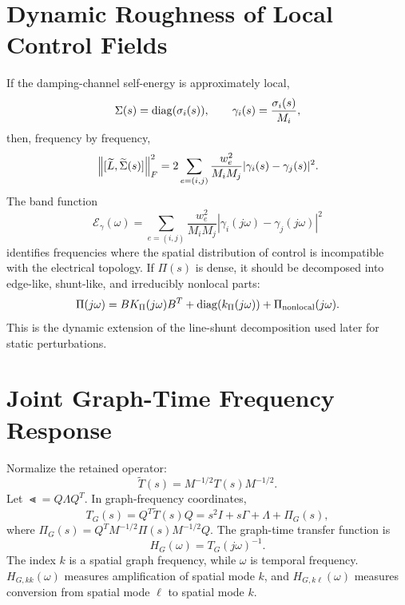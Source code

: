 \section{Dynamic Roughness of Local Control Fields}

If the damping-channel self-energy is approximately local,
\begin{equation}
  \Sigma(s)=\operatorname{diag}(\sigma_i(s)),
  \qquad
  \gamma_i(s)=\frac{\sigma_i(s)}{M_i},
  \label{eq:graph_dynamic_gamma}
\end{equation}
then, frequency by frequency,
\begin{equation}
  \left\lVert [\widetilde L,\widetilde\Sigma(s)] \right\rVert_F^2
  =
  2\sum_{e=(i,j)}
  \frac{w_e^2}{M_iM_j}
  |\gamma_i(s)-\gamma_j(s)|^2.
  \label{eq:graph_dynamic_roughness}
\end{equation}
The band function
\begin{equation}
  \mathcal E_\gamma(\omega)
  =
  \sum_{e=(i,j)}
  \frac{w_e^2}{M_iM_j}
  |\gamma_i(j\omega)-\gamma_j(j\omega)|^2
  \label{eq:graph_dynamic_roughness_band}
\end{equation}
identifies frequencies where the spatial distribution of control is
incompatible with the electrical topology. If \(\Pi(s)\) is dense, it should
be decomposed into edge-like, shunt-like, and irreducibly nonlocal parts:
\begin{equation}
  \Pi(j\omega)
  =
  B K_\Pi(j\omega)B^T
  +
  \operatorname{diag}(k_\Pi(j\omega))
  +
  \Pi_{\rm nonlocal}(j\omega).
  \label{eq:graph_pi_edge_shunt_nonlocal}
\end{equation}
This is the dynamic extension of the line-shunt decomposition used later for
static perturbations.

\section{Joint Graph-Time Frequency Response}

Normalize the retained operator:
\begin{equation}
  \widetilde T(s)=M^{-1/2}T(s)M^{-1/2}.
  \label{eq:graph_normalized_T}
\end{equation}
Let \(\Lt=Q\Lambda Q^T\). In graph-frequency coordinates,
\begin{equation}
  T_G(s)
  =
  Q^T\widetilde T(s)Q
  =
  s^2I+s\Gamma+\Lambda+\Pi_G(s),
  \label{eq:graph_time_operator}
\end{equation}
where \(\Pi_G(s)=Q^TM^{-1/2}\Pi(s)M^{-1/2}Q\). The graph-time transfer
function is
\begin{equation}
  H_G(\omega)=T_G(j\omega)^{-1}.
  \label{eq:graph_time_transfer}
\end{equation}
The index \(k\) is a spatial graph frequency, while \(\omega\) is temporal
frequency. \(H_{G,kk}(\omega)\) measures amplification of spatial mode \(k\),
and \(H_{G,k\ell}(\omega)\) measures conversion from spatial mode \(\ell\) to
spatial mode \(k\).

